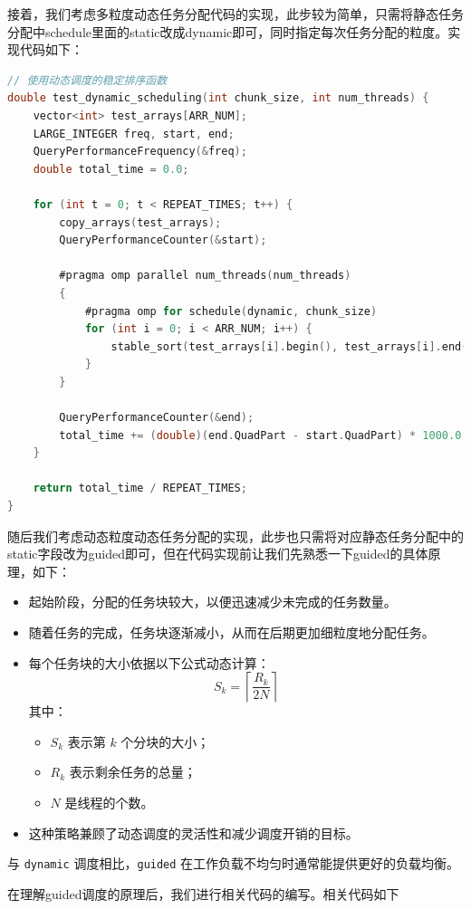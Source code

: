 \documentclass{nku}
\begin{document}
接着，我们考虑多粒度动态任务分配代码的实现，此步较为简单，只需将静态任务分配中schedule里面的static改成dynamic即可，同时指定每次任务分配的粒度。实现代码如下：
\begin{lstlisting}[language=C]
// 使用动态调度的稳定排序函数
double test_dynamic_scheduling(int chunk_size, int num_threads) {
    vector<int> test_arrays[ARR_NUM];
    LARGE_INTEGER freq, start, end;
    QueryPerformanceFrequency(&freq);
    double total_time = 0.0;

    for (int t = 0; t < REPEAT_TIMES; t++) {
        copy_arrays(test_arrays);
        QueryPerformanceCounter(&start);

        #pragma omp parallel num_threads(num_threads)
        {
            #pragma omp for schedule(dynamic, chunk_size)
            for (int i = 0; i < ARR_NUM; i++) {
                stable_sort(test_arrays[i].begin(), test_arrays[i].end());
            }
        }

        QueryPerformanceCounter(&end);
        total_time += (double)(end.QuadPart - start.QuadPart) * 1000.0 / freq.QuadPart;
    }

    return total_time / REPEAT_TIMES;
}
\end{lstlisting}

随后我们考虑动态粒度动态任务分配的实现，此步也只需将对应静态任务分配中的static字段改为guided即可，但在代码实现前让我们先熟悉一下guided的具体原理，如下：
\begin{itemize}
    \item 起始阶段，分配的任务块较大，以便迅速减少未完成的任务数量。
    \item 随着任务的完成，任务块逐渐减小，从而在后期更加细粒度地分配任务。
    \item 每个任务块的大小依据以下公式动态计算：
    \[
    S_k = \left\lceil \frac{R_k}{2N} \right\rceil
    \]
    其中：
    \begin{itemize}
        \item $S_k$ 表示第 $k$ 个分块的大小；
        \item $R_k$ 表示剩余任务的总量；
        \item $N$ 是线程的个数。
    \end{itemize}
    \item 这种策略兼顾了动态调度的灵活性和减少调度开销的目标。
\end{itemize}
与 \texttt{dynamic} 调度相比，\texttt{guided} 在工作负载不均匀时通常能提供更好的负载均衡。

在理解guided调度的原理后，我们进行相关代码的编写。相关代码如下
\end{document}
